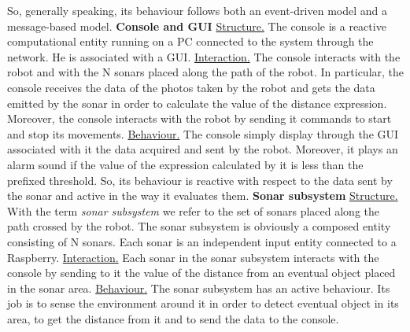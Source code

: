 \documentclass[a4paper]{article}
\begin{document}
So, generally speaking, its behaviour follows both an event-driven model and a message-based model.
\newline\newline\newline
{\large\textbf{Console and GUI}}\newline\newline
\underline{Structure.} The console is a reactive computational entity running on a PC connected to the system through the network. He is associated with a GUI.\newline\newline
\underline{Interaction.} The console interacts with the robot and with the N sonars placed along the path of the robot. In particular, the console receives the data of the photos taken by the robot and gets the data emitted by the sonar in order to calculate the value of the distance expression. Moreover, the console interacts with the robot by sending it commands to start and stop its movements.\newline\newline
\underline{Behaviour.} The console simply display through the GUI associated with it the data acquired and sent by the robot. Moreover, it plays an alarm sound if the value of the expression calculated by it is less than the prefixed threshold. So, its behaviour is reactive with respect to the data sent by the sonar and active in the way it evaluates them.
\newline\newline\newline
{\large\textbf{Sonar subsystem}}\newline\newline
\underline{Structure.} With the term \textit{sonar subsystem} we refer to the set of sonars placed along the path crossed by the robot. The sonar subsystem is obviously a composed entity consisting of N sonars. Each sonar is an independent input entity connected to a Raspberry.\newline\newline
\underline{Interaction.} Each sonar in the sonar subsystem interacts with the console by sending to it the value of the distance from an eventual object placed in the sonar area.
\newline\newline
\underline{Behaviour.} The sonar subsystem has an active behaviour. Its job is to sense the environment around it in order to detect eventual object in its area, to get the distance from it and to send the data to the console.
\end{document}
